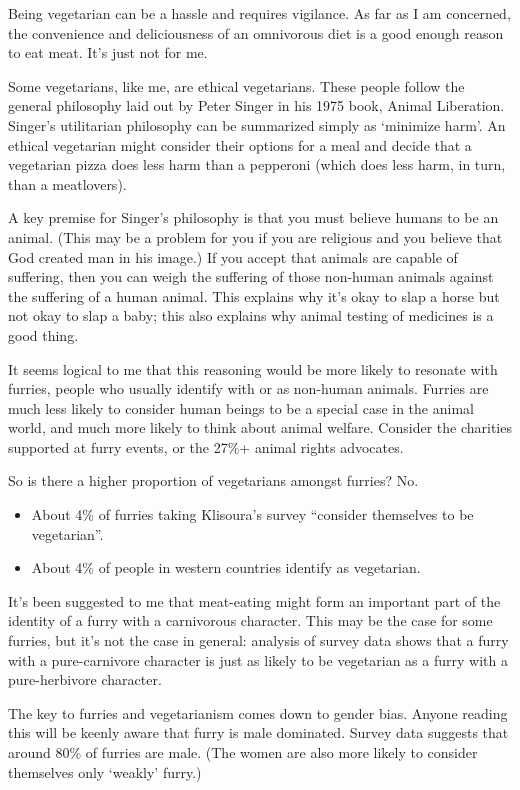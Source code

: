 Being vegetarian can be a hassle and requires vigilance. As far as I am concerned, the convenience and deliciousness of an omnivorous diet is a good enough reason to eat meat. It's just not for me.

Some vegetarians, like me, are ethical vegetarians. These people follow the general philosophy laid out by Peter Singer in his 1975 book, Animal Liberation. Singer's utilitarian philosophy can be summarized simply as `minimize harm'. An ethical vegetarian might consider their options for a meal and decide that a vegetarian pizza does less harm than a pepperoni (which does less harm, in turn, than a meatlovers).

A key premise for Singer's philosophy is that you must believe humans to be an animal. (This may be a problem for you if you are religious and you believe that God created man in his image.) If you accept that animals are capable of suffering, then you can weigh the suffering of those non-human animals against the suffering of a human animal. This explains why it's okay to slap a horse but not okay to slap a baby; this also explains why animal testing of medicines is a good thing.

It seems logical to me that this reasoning would be more likely to resonate with furries, people who usually identify with or as non-human animals. Furries are much less likely to consider human beings to be a special case in the animal world, and much more likely to think about animal welfare. Consider the charities supported at furry events, or the 27\%+ animal rights advocates.

So is there a higher proportion of vegetarians amongst furries? No.

\begin{itemize}
  \item About 4\% of furries taking Klisoura's survey ``consider themselves to be vegetarian''.
  \item About 4\% of people in western countries identify as vegetarian.
\end{itemize}

It's been suggested to me that meat-eating might form an important part of the identity of a furry with a carnivorous character. This may be the case for some furries, but it's not the case in general: analysis of survey data shows that a furry with a pure-carnivore character is just as likely to be vegetarian as a furry with a pure-herbivore character.

The key to furries and vegetarianism comes down to gender bias. Anyone reading this will be keenly aware that furry is male dominated. Survey data suggests that around 80\% of furries are male. (The women are also more likely to consider themselves only `weakly' furry.)

